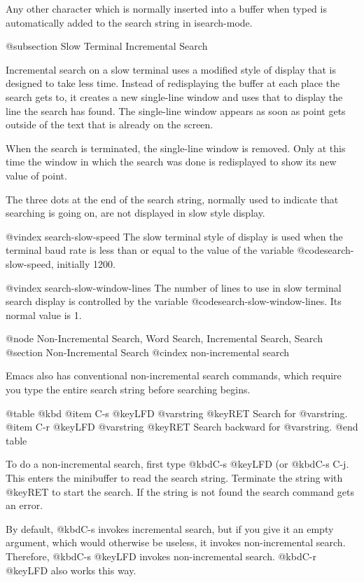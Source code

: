 {{{{Any other character which is normally inserted into a buffer when typed
is automatically added to the search string in isearch-mode.

@subsection Slow Terminal Incremental Search

  Incremental search on a slow terminal uses a modified style of display
that is designed to take less time.  Instead of redisplaying the buffer at
each place the search gets to, it creates a new single-line window and uses
that to display the line the search has found.  The single-line window
appears as soon as point gets outside of the text that is already
on the screen.

  When the search is terminated, the single-line window is removed.  Only
at this time the window in which the search was done is redisplayed to show
its new value of point.

  The three dots at the end of the search string, normally used to indicate
that searching is going on, are not displayed in slow style display.

@vindex search-slow-speed
  The slow terminal style of display is used when the terminal baud rate is
less than or equal to the value of the variable @code{search-slow-speed},
initially 1200.

@vindex search-slow-window-lines
  The number of lines to use in slow terminal search display is controlled
by the variable @code{search-slow-window-lines}.  Its normal value is 1.

@node Non-Incremental Search, Word Search, Incremental Search, Search
@section Non-Incremental Search
@cindex non-incremental search

  Emacs also has conventional non-incremental search commands, which require
you type the entire search string before searching begins.

@table @kbd
@item C-s @key{LFD} @var{string} @key{RET}
Search for @var{string}.
@item C-r @key{LFD} @var{string} @key{RET}
Search backward for @var{string}.
@end table

  To do a non-incremental search, first type @kbd{C-s @key{LFD}}
(or @kbd{C-s C-j}.  This enters the minibuffer to read the search string.
Terminate the string with @key{RET} to start the search.  If the string
is not found the search command gets an error.

 By default, @kbd{C-s} invokes incremental search, but if you give it an
empty argument, which would otherwise be useless, it invokes non-incremental
search.  Therefore, @kbd{C-s @key{LFD}} invokes non-incremental search. 
@kbd{C-r @key{LFD}} also works this way.

}}}}
